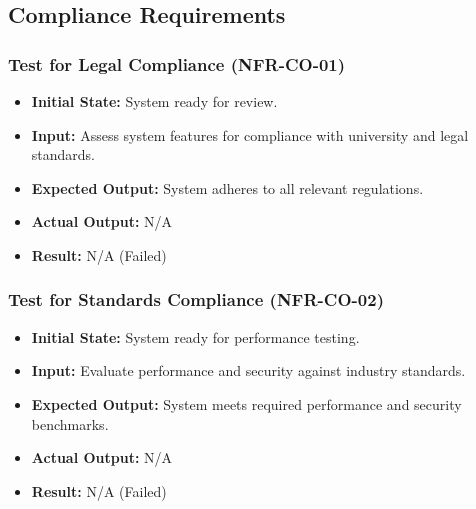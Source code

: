 \documentclass[12pt, titlepage]{article}
\begin{document}
\subsection{Compliance Requirements}

\subsubsection{Test for Legal Compliance (NFR-CO-01)}
\begin{itemize}
    \item \textbf{Initial State: }System ready for review.
    \item \textbf{Input: }Assess system features for compliance with university and legal standards.
    \item \textbf{Expected Output: }System adheres to all relevant regulations.
    \item \textbf{Actual Output: }N/A
    \item \textbf{Result: }N/A (Failed)
\end{itemize}

\subsubsection{Test for Standards Compliance (NFR-CO-02)}
\begin{itemize}
    \item \textbf{Initial State: }System ready for performance testing.
    \item \textbf{Input: }Evaluate performance and security against industry standards.
    \item \textbf{Expected Output: }System meets required performance and security benchmarks.
    \item \textbf{Actual Output: }N/A
    \item \textbf{Result: }N/A (Failed)
\end{itemize}

\end{document}
